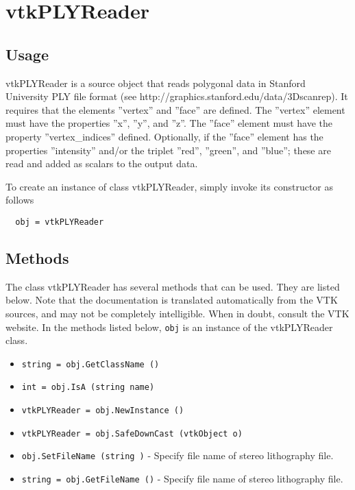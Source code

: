\section{vtkPLYReader}

\subsection{Usage}

 vtkPLYReader is a source object that reads polygonal data in
 Stanford University PLY file format (see 
 http://graphics.stanford.edu/data/3Dscanrep). It requires that
 the elements ''vertex'' and ''face'' are defined. The ''vertex'' element
 must have the properties ''x'', ''y'', and ''z''. The ''face'' element must
 have the property ''vertex\_indices'' defined. Optionally, if the ''face''
 element has the properties ''intensity'' and/or the triplet ''red'',
 ''green'', and ''blue''; these are read and added as scalars to the
 output data.

To create an instance of class vtkPLYReader, simply
invoke its constructor as follows
\begin{verbatim}
  obj = vtkPLYReader
\end{verbatim}
\subsection{Methods}

The class vtkPLYReader has several methods that can be used.
  They are listed below.
Note that the documentation is translated automatically from the VTK sources,
and may not be completely intelligible.  When in doubt, consult the VTK website.
In the methods listed below, \verb|obj| is an instance of the vtkPLYReader class.
\begin{itemize}
\item  \verb|string = obj.GetClassName ()|

\item  \verb|int = obj.IsA (string name)|

\item  \verb|vtkPLYReader = obj.NewInstance ()|

\item  \verb|vtkPLYReader = obj.SafeDownCast (vtkObject o)|

\item  \verb|obj.SetFileName (string )| -  Specify file name of stereo lithography file.

\item  \verb|string = obj.GetFileName ()| -  Specify file name of stereo lithography file.

\end{itemize}
